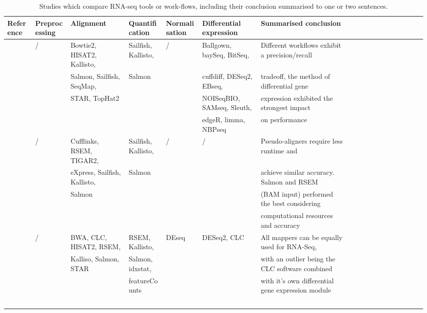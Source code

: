 \begin{landscape}
	\pagestyle{empty}
\begin{table}[h]
	\tiny
    \centering
    \captionsetup{font=scriptsize}
    \caption{Studies which compare RNA-seq tools or work-flows, including their conclusion summarised to one or two sentences.}
    \label{tab:rnaseq_review}
    \begin{adjustwidth}{-1cm}{}
    \begin{tabular}{llllllllllllllllll}
		\toprule
        \textbf{Reference} & \textbf{Preprocessing} & \textbf{Alignment} & \textbf{Quantification} & \textbf{Normalisation} & \textbf{Differential expression} & \textbf{Summarised conclusion}  \\ \midrule
        \cite{williams2017empirical} & / &  Bowtie2, HISAT2, Kallisto, & Sailfish, Kallisto,  & / & Ballgown, baySeq, BitSeq,  & Different workflows exhibit a precision/recall   \\ 
        ~ & ~ &  Salmon, Sailfish, SeqMap,  & Salmon & ~ & cuffdiff, DESeq2, EBseq,  & tradeoff,  the method of differential gene  \\ 
        ~ & ~ & STAR, TopHat2 & ~ & ~ & NOISeqBIO, SAMseq, Sleuth,  &  expression exhibited the strongest impact  \\ 
        ~ & ~ & ~ & ~ & ~ & edgeR, limma, NBPseq &  on performance  \\ \hline
        \cite{Zhang2017} & / & Cufflinks, RSEM, TIGAR2,  & Sailfish, Kallisto,  & / & / & Pseudo-aligners require less runtime and   \\ 
        ~ & ~ & eXpress, Sailfish, Kallisto,  & Salmon & ~ & ~ & achieve similar accuracy. Salmon and RSEM  \\
        ~ & ~ & Salmon & ~ & ~ & ~ &  (BAM input) performed the best considering  \\ 
        ~ & ~ & ~ & ~ & ~ & ~ &  computational resources and accuracy  \\ \hline
        \cite{Schaarschmidt2020} & / & BWA, CLC, HISAT2, RSEM,   & RSEM, Kallisto,  &  DEseq & DESeq2, CLC & All mappers can be equally used for RNA-Seq,    \\ 
        ~ & ~ & Kalliso, Salmon, STAR & Salmon,  idxstat, & ~ & ~ & with an outlier being the CLC software combined   \\ 
        ~ & ~ & ~ & featureCounts & ~ & ~ & with it's own differential gene expression module  \\ 
        ~ & ~ & ~ & ~ & ~ & ~ &   \\ \hline

\end{tabular}
\end{adjustwidth}
\end{table}
\end{landscape}
